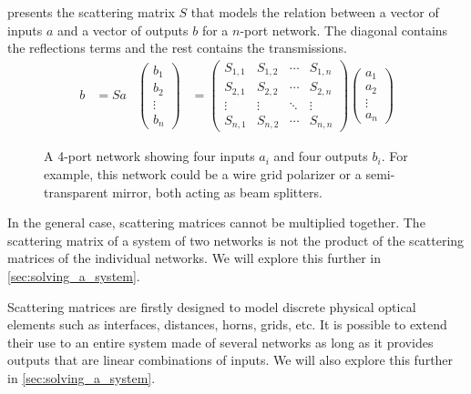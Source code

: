  presents the scattering matrix $S$ that models the relation between a vector of inputs $a$ and a vector of outputs $b$ for a $n$-port network.
The diagonal contains the reflections terms and the rest contains the transmissions.
\begin{align}
    b &= S a
    &
    \begin{pmatrix}
        b_1\\
        b_2\\
        \vdots\\
        b_n
    \end{pmatrix}
    &=
    \begin{pmatrix}
        S_{1, 1} & S_{1, 2} & \cdots & S_{1, n} \\
        S_{2, 1} & S_{2, 2} & \cdots & S_{2, n} \\
        \vdots   & \vdots   & \ddots & \vdots   \\
        S_{n, 1} & S_{n, 2} & \cdots & S_{n, n}
    \end{pmatrix}
    \begin{pmatrix}
        a_1\\
        a_2\\
        \vdots\\
        a_n
    \end{pmatrix}
    \label{eq:scattering_matrix}
\end{align}

\begin{figure}[hbtp]
    \centering
    
    \caption{A 4-port network showing four inputs $a_i$ and four outputs $b_i$.  For example, this network could be a wire grid polarizer or a semi-transparent mirror, both acting as beam splitters.}%
    \label{fig:scattering_matrix_notations}
\end{figure}

In the general case, scattering matrices cannot be multiplied together.
The scattering matrix of a system of two networks is not the product of the scattering matrices of the individual networks.
We will explore this further in \cref{sec:solving_a_system}.

Scattering matrices are firstly designed to model discrete physical optical elements such as interfaces, distances, horns, grids, etc.
It is possible to extend their use to an entire system made of several networks as long as it provides outputs that are linear combinations of inputs.
We will also explore this further in \cref{sec:solving_a_system}.



